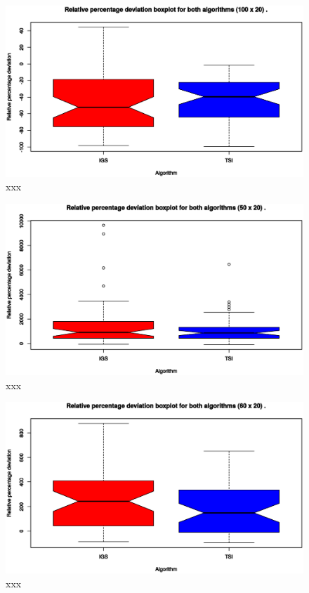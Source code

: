

\begin{figure}[H]
	\centering
	\includegraphics[width=\textwidth]{fig/box/100x20}
	\caption{xxx}
\end{figure}

\begin{figure}[H]
	\centering
	\includegraphics[width=\textwidth]{fig/box/50x20}
	\caption{xxx}
\end{figure}

\begin{figure}[H]
	\centering
	\includegraphics[width=\textwidth]{fig/box/60x20}
	\caption{xxx}
\end{figure}

